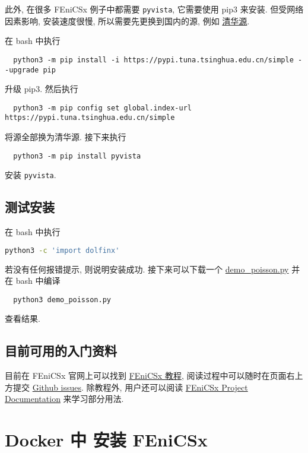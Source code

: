 \documentclass[fontset=founder]{ctexrep}
\begin{document}
此外,
在很多 FEniCSx 例子中都需要 \texttt{pyvista},
它需要使用 \textsf{pip3} 来安装.
但受网络因素影响,
安装速度很慢,
所以需要先更换到国内的源,
例如%
\href{https://mirrors.tuna.tsinghua.edu.cn/help/pypi/}{清华源}.

在 \textsf{bash} 中执行
\begin{lstlisting}
  python3 -m pip install -i https://pypi.tuna.tsinghua.edu.cn/simple --upgrade pip
\end{lstlisting}
升级 \textsf{pip3}.
然后执行
\begin{lstlisting}
  python3 -m pip config set global.index-url https://pypi.tuna.tsinghua.edu.cn/simple
\end{lstlisting}
将源全部换为清华源.
接下来执行
\begin{lstlisting}
  python3 -m pip install pyvista
\end{lstlisting}
安装 \texttt{pyvista}.

\section{测试安装}

在 \textsf{bash} 中执行
\begin{lstlisting}[language = bash]
  python3 -c 'import dolfinx'
\end{lstlisting}
若没有任何报错提示,
则说明安装成功.
接下来可以下载一个
\href{https://docs.fenicsproject.org/dolfinx/main/python/_downloads/b94ac7be61dc3726ca331afd20f195d2/demo_poisson.py}{demo\_poisson.py}
并在 \textsf{bash} 中编译
\begin{lstlisting}
  python3 demo_poisson.py
\end{lstlisting}
查看结果.

\section{目前可用的入门资料}

目前在 FEniCSx 官网上可以找到
\href{https://jsdokken.com/dolfinx-tutorial/}{FEniCSx 教程},
阅读过程中可以随时在页面右上方提交 \href{https://github.com/jorgensd/dolfinx-tutorial/issues/new?title=Issue%20on%20page%20%2Findex.html&body=Your%20issue%20content%20here.}{Github issues}.
除教程外,
用户还可以阅读
\href{https://docs.fenicsproject.org/}{FEniCSx Project Documentation}
来学习部分用法.

\chapter{Docker 中 安装 FEniCSx}
\end{document}
